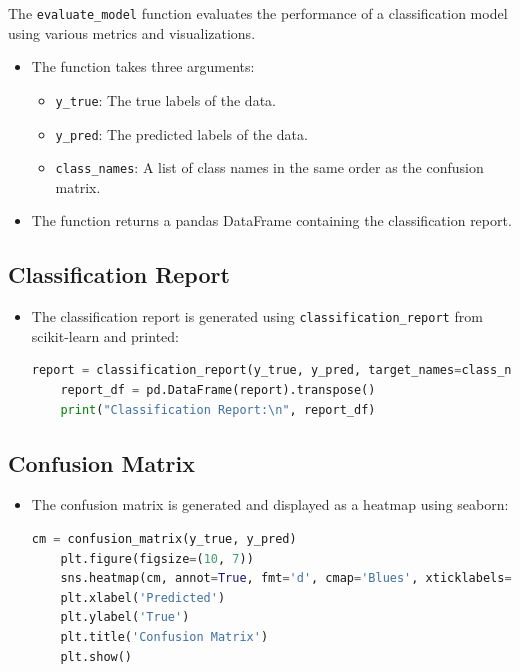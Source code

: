 \documentclass{solutionclass} %
\begin{document}
\begin{solution}
	The \texttt{evaluate\_model} function evaluates the performance of a classification model using various metrics and visualizations.
\begin{itemize}
    \item The function takes three arguments:
    \begin{itemize}
        \item \texttt{y\_true}: The true labels of the data.
        \item \texttt{y\_pred}: The predicted labels of the data.
        \item \texttt{class\_names}: A list of class names in the same order as the confusion matrix.
    \end{itemize}
    \item The function returns a pandas DataFrame containing the classification report.
\end{itemize}

\subsection*{Classification Report}

\begin{itemize}
    \item The classification report is generated using \texttt{classification\_report} from scikit-learn and printed:
    \begin{lstlisting}[language=Python]
    report = classification_report(y_true, y_pred, target_names=class_names, output_dict=True)
    report_df = pd.DataFrame(report).transpose()
    print("Classification Report:\n", report_df)
    \end{lstlisting}
\end{itemize}

\subsection*{Confusion Matrix}

\begin{itemize}
    \item The confusion matrix is generated and displayed as a heatmap using seaborn:
    \begin{lstlisting}[language=Python]
    cm = confusion_matrix(y_true, y_pred)
    plt.figure(figsize=(10, 7))
    sns.heatmap(cm, annot=True, fmt='d', cmap='Blues', xticklabels=class_names, yticklabels=class_names)
    plt.xlabel('Predicted')
    plt.ylabel('True')
    plt.title('Confusion Matrix')
    plt.show()
    \end{lstlisting}
\end{itemize}


\end{solution}
\end{document}
